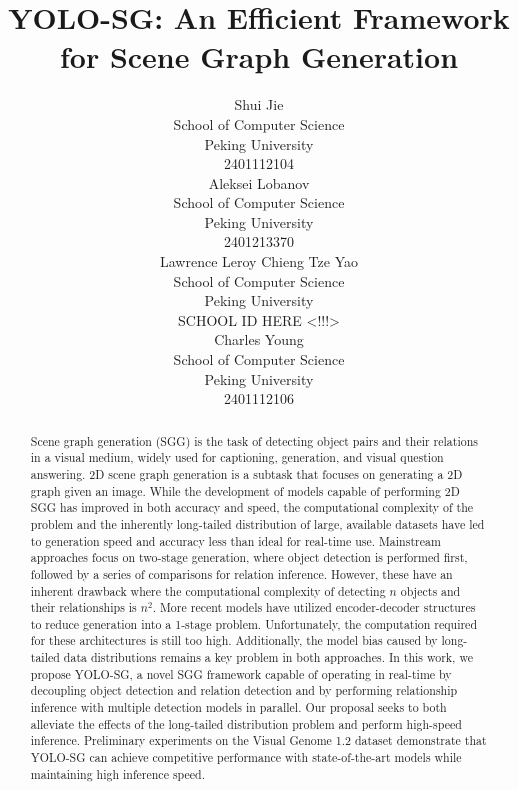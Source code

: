 \documentclass{article}
\title{YOLO-SG: An Efficient Framework for Scene Graph Generation}
\author{
  Shui Jie \\
  School of Computer Science\\
  Peking University\\
  2401112104 \\
  \And
  Aleksei Lobanov \\
  School of Computer Science\\
  Peking University\\
  2401213370  \\
  \AND
  Lawrence Leroy Chieng Tze Yao \\
  School of Computer Science\\
  Peking University\\
  SCHOOL ID HERE <!!!> \\
  \And
  Charles Young \\
  School of Computer Science\\
  Peking University\\
  2401112106
}
\begin{document}
\maketitle


\begin{abstract}
    Scene graph generation (SGG) is the task of detecting object pairs and their relations in a visual medium, widely used for captioning, generation, and visual question answering. 2D scene graph generation is a subtask that focuses on generating a 2D graph given an image. While the development of models capable of performing 2D SGG has improved in both accuracy and speed, the computational complexity of the problem and the inherently long-tailed distribution of large, available datasets have led to generation speed and accuracy less than ideal for real-time use. Mainstream approaches focus on two-stage generation, where object detection is performed first, followed by a series of comparisons for relation inference. However, these have an inherent drawback where the computational complexity of detecting $n$ objects and their relationships is $n^2$. More recent models have utilized encoder-decoder structures to reduce generation into a 1-stage problem. Unfortunately, the computation required for these architectures is still too high. Additionally, the model bias caused by long-tailed data distributions remains a key problem in both approaches. In this work, we propose YOLO-SG, a novel SGG framework capable of operating in real-time by decoupling object detection and relation detection and by performing relationship inference with multiple detection models in parallel. Our proposal seeks to both alleviate the effects of the long-tailed distribution problem and perform high-speed inference. Preliminary experiments on the Visual Genome 1.2 dataset demonstrate that YOLO-SG can achieve competitive performance with state-of-the-art models while maintaining high inference speed.
\end{abstract}
\end{document}
